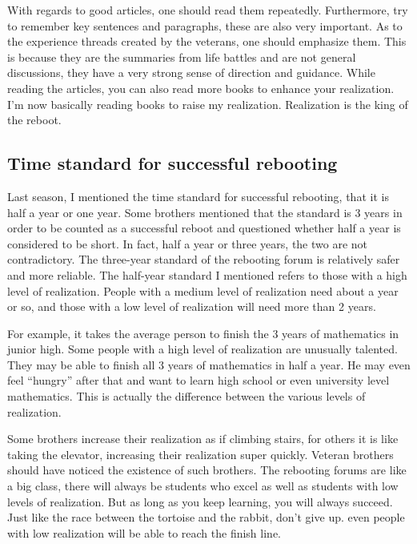 \documentclass[
]{book}
\begin{document}
With regards to good articles, one should read them repeatedly. Furthermore, try to remember key sentences and paragraphs, these are also very important. As to the experience threads created by the veterans, one should emphasize them. This is because they are the summaries from life battles and are not general discussions, they have a very strong sense of direction and guidance. While reading the articles, you can also read more books to enhance your realization. I'm now basically reading books to raise my realization. Realization is the king of the reboot.

\hypertarget{time-standard-for-successful-rebooting}{%
\subsection{Time standard for successful rebooting}\label{time-standard-for-successful-rebooting}}

Last season, I mentioned the time standard for successful rebooting, that it is half a year or one year. Some brothers mentioned that the standard is 3 years in order to be counted as a successful reboot and questioned whether half a year is considered to be short. In fact, half a year or three years, the two are not contradictory. The three-year standard of the rebooting forum is relatively safer and more reliable. The half-year standard I mentioned refers to those with a high level of realization. People with a medium level of realization need about a year or so, and those with a low level of realization will need more than 2 years.

For example, it takes the average person to finish the 3 years of mathematics in junior high. Some people with a high level of realization are unusually talented. They may be able to finish all 3 years of mathematics in half a year. He may even feel ``hungry'' after that and want to learn high school or even university level mathematics. This is actually the difference between the various levels of realization.

Some brothers increase their realization as if climbing stairs, for others it is like taking the elevator, increasing their realization super quickly. Veteran brothers should have noticed the existence of such brothers. The rebooting forums are like a big class, there will always be students who excel as well as students with low levels of realization. But as long as you keep learning, you will always succeed. Just like the race between the tortoise and the rabbit, don't give up. even people with low realization will be able to reach the finish line.
\end{document}
